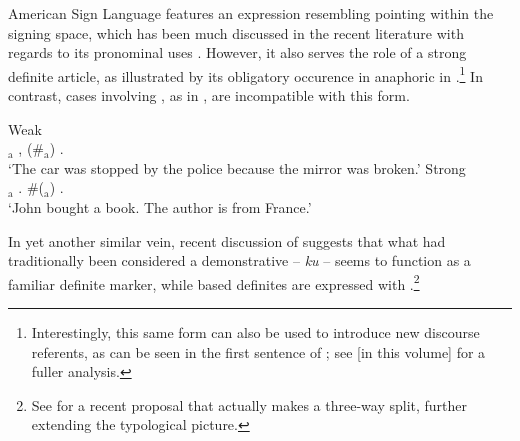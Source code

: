 \documentclass[output=paper
,modfonts
,nonflat]{langscibook}
\begin{document}
American Sign Language features an expression resembling pointing
within the signing space, which has been much discussed in the recent literature with regards
to its pronominal uses 
\citep{Schlenker2017}. However, it also serves the role of a strong
definite article, as illustrated by its obligatory occurence in
anaphoric  in .\footnote{Interestingly, this
  same form can also be used to introduce new discourse referents, as
  can be seen in the first sentence of ; see
  \citet{Irani2017} [in this volume] for a fuller analysis.} In contrast, cases
involving  , as in , are
incompatible with this form.

\begin{exe}
\ex\label{ex:schwarz:17} 
\begin{xlist}
\ex\label{ex:Schwarz:17a} Weak\\ $_\text{a}$ ,    (\#\textbf{}$_\text{a}$)  . \\
‘The car was stopped by the police because the mirror was broken.’ 
\ex\label{ex:schwarz17b} Strong\\   $_\text{a}$ . \#(\textbf{}$_\text{a}$)   .\\
   ‘John bought a book. The author is from France.’
\end{xlist}

\end{exe}

In yet another similar vein, recent discussion of  suggests that
what had traditionally been considered a demonstrative -- \textit{ku}
 -- seems to
function as a familiar definite marker, while  based
definites are expressed with .\footnote{See
  \citet{Ahn2017} for a recent proposal that  actually makes a
  three-way split, further extending the typological picture.}
\end{document}
